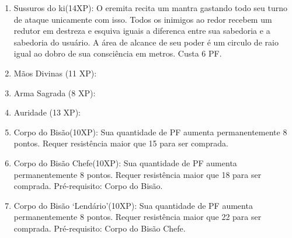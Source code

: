 \begin{enumerate}
	\item Sussuros do ki(14XP): O eremita recita um mantra gastando todo seu turno de ataque unicamente com isso. Todos os inimigos ao redor recebem um redutor em destreza e esquiva iguais a diferenca entre sua sabedoria e a sabedoria do usuário. A área de alcance de seu poder é um circulo de raio igual ao dobro de sua consciência em metros. Custa 6 PF.

	\item Mãos Divinas (11 XP): %

\item Arma Sagrada (8 XP): %

		\item Auridade (13 XP): %


	\item Corpo do Bisão(10XP): Sua quantidade de PF aumenta permanentemente 8 pontos. Requer resistência maior que 15 para ser comprada. 
	
	\item Corpo do Bisão Chefe(10XP): Sua quantidade de PF aumenta permanentemente 8 pontos. Requer resistência maior que 18 para ser comprada. Pré-requisito: Corpo do Bisão.

	\item Corpo do Bisão `Lendário'(10XP): Sua quantidade de PF aumenta permanentemente 8 pontos. Requer resistência maior que 22 para ser comprada. Pré-requisito: Corpo do Bisão Chefe.


\end{enumerate}
